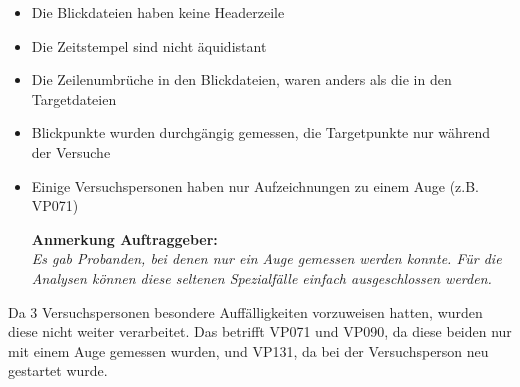 \begin{itemize}
	\item Die Blickdateien haben keine Headerzeile
	
	\item Die Zeitstempel sind nicht \"aquidistant
	
	\item Die Zeilenumbr\"uche in den Blickdateien, waren anders als die in den Targetdateien
	
	\item Blickpunkte wurden durchg\"angig gemessen, die Targetpunkte nur w\"ahrend der Versuche
	
	\item Einige Versuchspersonen haben nur Aufzeichnungen zu einem Auge (z.B. VP071)
	
	\textbf{Anmerkung Auftraggeber:}\\
	\textit{Es gab Probanden, bei denen nur ein Auge gemessen werden konnte. F\"ur die Analysen k\"onnen diese seltenen Spezialf\"alle einfach ausgeschlossen werden.}
	
	
\end{itemize}

Da 3 Versuchspersonen besondere Auff\"alligkeiten vorzuweisen hatten, wurden diese nicht weiter verarbeitet. Das betrifft VP071 und VP090, da diese beiden nur mit einem Auge gemessen wurden, und VP131, da bei der Versuchsperson neu gestartet wurde.